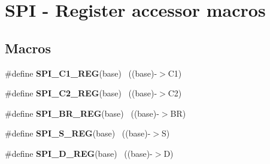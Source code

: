 \hypertarget{group___s_p_i___register___accessor___macros}{}\section{S\+P\+I -\/ Register accessor macros}
\label{group___s_p_i___register___accessor___macros}
\subsection*{Macros}
\begin{DoxyCompactItemize}
\item 
\hypertarget{group___s_p_i___register___accessor___macros_ga15cf0a6fa68781816e64f5bf3bd38d2a}{}\#define {\bfseries S\+P\+I\+\_\+\+C1\+\_\+\+R\+E\+G}(base)                                              ~((base)-\/$>$C1)\label{group___s_p_i___register___accessor___macros_ga15cf0a6fa68781816e64f5bf3bd38d2a}

\item 
\hypertarget{group___s_p_i___register___accessor___macros_ga82cc2ad7cb1e2b9737462735d8ed95aa}{}\#define {\bfseries S\+P\+I\+\_\+\+C2\+\_\+\+R\+E\+G}(base)                                              ~((base)-\/$>$C2)\label{group___s_p_i___register___accessor___macros_ga82cc2ad7cb1e2b9737462735d8ed95aa}

\item 
\hypertarget{group___s_p_i___register___accessor___macros_gac5dff3cf0898bfd7d2230d49cb3951a9}{}\#define {\bfseries S\+P\+I\+\_\+\+B\+R\+\_\+\+R\+E\+G}(base)                                              ~((base)-\/$>$B\+R)\label{group___s_p_i___register___accessor___macros_gac5dff3cf0898bfd7d2230d49cb3951a9}

\item 
\hypertarget{group___s_p_i___register___accessor___macros_ga88ebe8b9c7afe3c8d2aa0d9de8d860e2}{}\#define {\bfseries S\+P\+I\+\_\+\+S\+\_\+\+R\+E\+G}(base)                                                ~((base)-\/$>$S)\label{group___s_p_i___register___accessor___macros_ga88ebe8b9c7afe3c8d2aa0d9de8d860e2}

\item 
\hypertarget{group___s_p_i___register___accessor___macros_ga44444744f147821a03664f89cdf93c0c}{}\#define {\bfseries S\+P\+I\+\_\+\+D\+\_\+\+R\+E\+G}(base)                                                ~((base)-\/$>$D)\label{group___s_p_i___register___accessor___macros_ga44444744f147821a03664f89cdf93c0c}


\end{DoxyCompactItemize}
